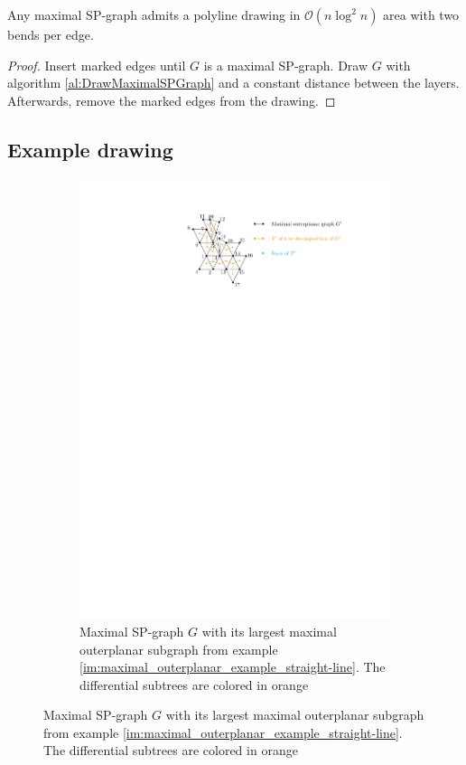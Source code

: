 \begin{theorem}
	Any maximal SP-graph admits a polyline drawing in $\mathcal{O}(n \log^2 n)$ area with two bends per edge.
\end{theorem}
\begin{proof}
	Insert marked edges until $G$ is a maximal SP-graph. Draw $G$ with algorithm \ref{al:DrawMaximalSPGraph} and a constant distance between the layers. Afterwards, remove the marked edges from the drawing.
\end{proof}


\subsection{Example drawing}

\begin{figure}[H]
	\centering
	\begin{subfigure}{\textwidth}
		\centering
		\includegraphics[page=10,width=0.8\linewidth]{graphics/maximal_outerplanar_example_drawings.pdf}
			\caption{Maximal SP-graph $G$ with its largest maximal outerplanar subgraph from example \ref{im:maximal_outerplanar_example_straight-line}. The differential subtrees are colored in orange}

\end{subfigure}
\end{figure}
